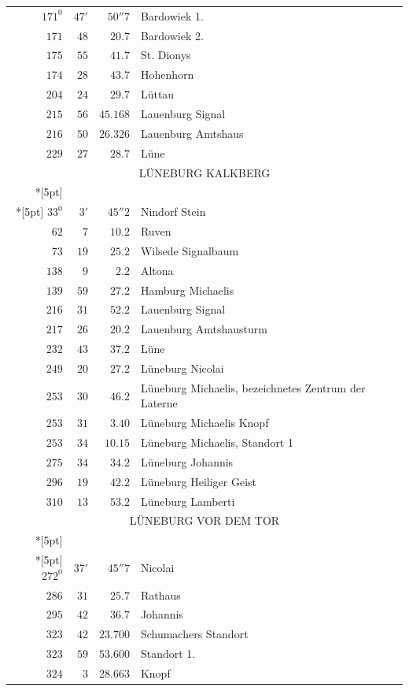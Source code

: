 \clearpage
{}%
\begingroup
\fontsize{10.5}{13}\selectfont
\setlength{\tabcolsep}{3pt}
\setlength{\LTpre}{2pt}
\setlength{\LTpost}{2pt}
\begin{longtable}{@{}rrrp{.61\linewidth}@{}}
\(171^{0}\)&\(47'\)&\(50''7\)&\raggedright Bardowiek 1.\tabularnewline
\(171\)&\(48\)&\(20.7\)&\raggedright Bardowiek 2.\tabularnewline
\(175\)&\(55\)&\(41.7\)&\raggedright St. Dionys\tabularnewline
\(174\)&\(28\)&\(43.7\)&\raggedright Hohenhorn\tabularnewline
\(204\)&\(24\)&\(29.7\)&\raggedright Lüttau\tabularnewline
\(215\)&\(56\)&\(45.168\)&\raggedright Lauenburg Signal\tabularnewline
\(216\)&\(50\)&\(26.326\)&\raggedright Lauenburg Amtshaus\tabularnewline
\(229\)&\(27\)&\(28.7\)&\raggedright Lüne\tabularnewline
\multicolumn{4}{c}{\strut LÜNEBURG KALKBERG}\\*[5pt]
\multicolumn{4}{c}{\(-191511.038\)\qquad\(-30282.895\)}\\*[5pt]
\(33^{0}\)&\(3'\)&\(45''2\)&\raggedright Nindorf Stein\tabularnewline
\(62\)&\(7\)&\(10.2\)&\raggedright Ruven\tabularnewline
\(73\)&\(19\)&\(25.2\)&\raggedright Wilsede Signalbaum\tabularnewline
\(138\)&\(9\)&\(2.2\)&\raggedright Altona\tabularnewline
\(139\)&\(59\)&\(27.2\)&\raggedright Hamburg Michaelis\tabularnewline
\(216\)&\(31\)&\(52.2\)&\raggedright Lauenburg Signal\tabularnewline
\(217\)&\(26\)&\(20.2\)&\raggedright Lauenburg Amtshausturm\tabularnewline
\(232\)&\(43\)&\(37.2\)&\raggedright Lüne\tabularnewline
\(249\)&\(20\)&\(27.2\)&\raggedright Lüneburg Nicolai\tabularnewline
\(253\)&\(30\)&\(46.2\)&\raggedright Lüneburg Michaelis, bezeichnetes Zentrum der Laterne\tabularnewline
\(253\)&\(31\)&\(3.40\)&\raggedright Lüneburg Michaelis Knopf\tabularnewline
\(253\)&\(34\)&\(10.15\)&\raggedright Lüneburg Michaelis, Standort 1\tabularnewline
\(275\)&\(34\)&\(34.2\)&\raggedright Lüneburg Johannis\tabularnewline
\(296\)&\(19\)&\(42.2\)&\raggedright Lüneburg Heiliger Geist\tabularnewline
\(310\)&\(13\)&\(53.2\)&\raggedright Lüneburg Lamberti\tabularnewline
\multicolumn{4}{c}{\strut LÜNEBURG VOR DEM TOR}\\*[5pt]
\multicolumn{4}{c}{\(-191882.273\)\qquad\(-30367.793\)}\\*[5pt]
\(272^{0}\)&\(37'\)&\(45''7\)&\raggedright Nicolai\tabularnewline
\(286\)&\(31\)&\(25.7\)&\raggedright Rathaus\tabularnewline
\(295\)&\(42\)&\(36.7\)&\raggedright Johannis\tabularnewline
\(323\)&\(42\)&\(23.700\)&\raggedright Schumachers Standort\tabularnewline
\(323\)&\(59\)&\(53.600\)&\raggedright Standort 1.\tabularnewline
\(324\)&\(3\)&\(28.663\)&\raggedright Knopf\tabularnewline

\end{longtable}
